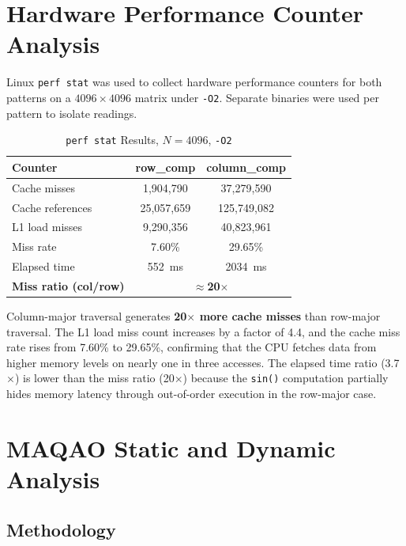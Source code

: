 \documentclass[conference]{IEEEtran}
\begin{document}
\section{Hardware Performance Counter Analysis}
\label{sec:perf}

Linux \texttt{perf stat} was used to collect hardware performance counters for
both patterns on a $4096 \times 4096$ matrix under \texttt{-O2}. Separate
binaries were used per pattern to isolate readings.

\begin{table}[H]
\caption{\texttt{perf stat} Results, $N = 4096$, \texttt{-O2}}
\label{tab:perf}
\centering
\begin{tabular}{lcc}
\toprule
\textbf{Counter} & \textbf{row\_comp} & \textbf{column\_comp} \\
\midrule
Cache misses         & 1,904,790    & 37,279,590    \\
Cache references     & 25,057,659   & 125,749,082   \\
L1 load misses       & 9,290,356    & 40,823,961    \\
Miss rate            & 7.60\%       & 29.65\%       \\
Elapsed time         & 552~ms       & 2034~ms       \\
\midrule
\textbf{Miss ratio (col/row)} &
\multicolumn{2}{c}{\textbf{$\approx$20$\times$}} \\
\bottomrule
\end{tabular}
\end{table}

Column-major traversal generates \textbf{20$\times$ more cache misses} than
row-major traversal. The L1 load miss count increases by a factor of 4.4, and
the cache miss rate rises from 7.60\% to 29.65\%, confirming that the CPU
fetches data from higher memory levels on nearly one in three accesses. The
elapsed time ratio (3.7$\times$) is lower than the miss ratio (20$\times$)
because the \texttt{sin()} computation partially hides memory latency through
out-of-order execution in the row-major case.

\section{MAQAO Static and Dynamic Analysis}
\label{sec:maqao}

\subsection{Methodology}
\end{document}
